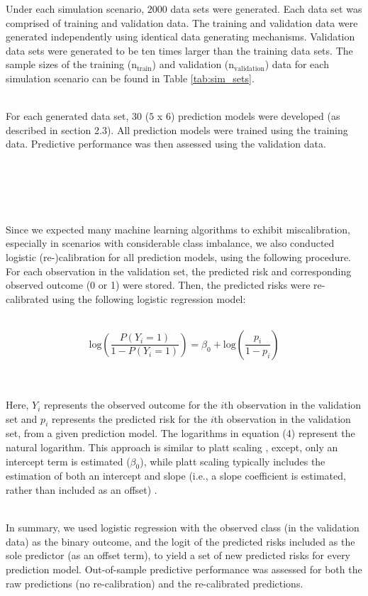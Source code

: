 \documentclass[AMA,STIX1COL,]{WileyNJD-v2}
\begin{document}
\hfill\break
Under each simulation scenario, \(2000\) data sets were generated. Each
data set was comprised of training and validation data. The training and
validation data were generated independently using identical data
generating mechanisms. Validation data sets were generated to be ten
times larger than the training data sets. The sample sizes of the
training (\(\mathrm{n}_{\mathrm{train}}\)) and validation
(\(\mathrm{n}_{\mathrm{validation}}\)) data for each simulation scenario
can be found in Table \ref{tab:sim_sets}.\\
\strut \\
For each generated data set, 30 (\(5\) x \(6\)) prediction models were
developed (as described in section 2.3). All prediction models were
trained using the training data. Predictive performance was then
assessed using the validation data.\\
\strut \\
\strut \\
\strut \\
Since we expected many machine learning algorithms to exhibit
miscalibration, especially in scenarios with considerable class
imbalance, we also conducted logistic (re-)calibration for all
prediction models, using the following procedure. For each observation
in the validation set, the predicted risk and corresponding observed
outcome (0 or 1) were stored. Then, the predicted risks were
re-calibrated using the following logistic regression model:\\
\strut \\
\begin{equation}
\mathrm{log} \left( \frac{P(Y_i = 1)}{1- P(Y_i = 1)} \right) = \beta_0 + \mathrm{log} \left( \frac{p_i}{1-p_i} \right)
\end{equation}\\
\strut \\
Here, \(Y_i\) represents the observed outcome for the \(i\)th
observation in the validation set and \(p_i\) represents the predicted
risk for the \(i\)th observation in the validation set, from a given
prediction model. The logarithms in equation (4) represent the natural
logarithm. This approach is similar to platt scaling \citep{platt},
except, only an intercept term is estimated (\(\beta_0\)), while platt
scaling typically includes the estimation of both an intercept and slope
(i.e., a slope coefficient is estimated, rather than included as an
offset) \citep{platt}.\\
\strut \\
In summary, we used logistic regression with the observed class (in the
validation data) as the binary outcome, and the logit of the predicted
risks included as the sole predictor (as an offset term), to yield a set
of new predicted risks for every prediction model. Out-of-sample
predictive performance was assessed for both the raw predictions (no
re-calibration) and the re-calibrated predictions.
\end{document}
